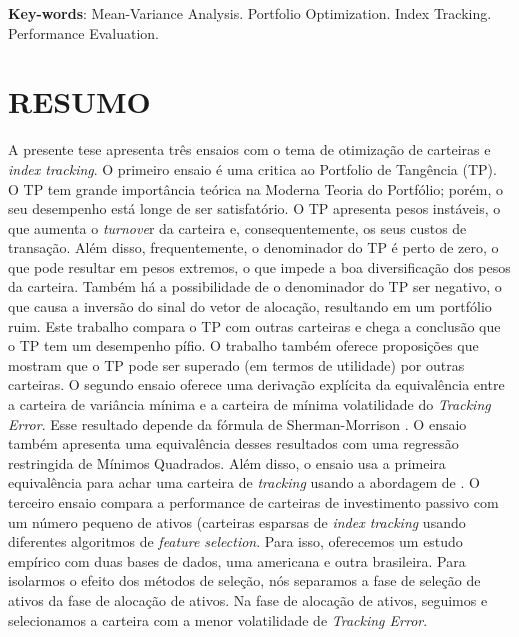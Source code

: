 \documentclass[12pt,oneside,a4paper]{memoir}
\begin{document}
\noindent
\textbf{Key-words}: Mean-Variance Analysis. Portfolio Optimization. Index Tracking. Performance Evaluation.

\chapter*{RESUMO}

\noindent
A presente tese apresenta três ensaios com o tema de otimização de carteiras e \textit{index tracking}.
O primeiro ensaio é uma critica ao Portfolio de Tangência (TP).
O TP tem grande importância teórica na Moderna Teoria do Portfólio; porém, o seu desempenho está longe de ser satisfatório.
O TP apresenta pesos instáveis, o que aumenta o \textit{turnove}r da carteira e, consequentemente, os seus custos de transação.
Além disso, frequentemente, o denominador do TP é perto de zero, o que pode resultar em pesos extremos, o que impede a boa diversificação dos pesos da carteira.
Também há a possibilidade de o denominador do TP ser negativo, o que causa a inversão do sinal do vetor de alocação, resultando em um portfólio ruim.
Este trabalho compara o TP com outras carteiras e chega a conclusão que o TP tem um desempenho pífio.
O trabalho também oferece proposições que mostram que o TP pode ser superado (em termos de utilidade) por outras carteiras.
O segundo ensaio oferece uma derivação explícita da equivalência entre a carteira de variância mínima e a carteira de mínima volatilidade do \textit{Tracking Error}.
Esse resultado depende da fórmula de Sherman-Morrison .
O ensaio também apresenta uma equivalência desses resultados com uma regressão restringida de Mínimos Quadrados.
Além disso, o ensaio usa a primeira equivalência para achar uma carteira de \textit{tracking} usando a abordagem de .
O terceiro ensaio compara a performance de carteiras de investimento passivo com um número pequeno de ativos (carteiras esparsas de \textit{index tracking} usando diferentes algoritmos de \textit{feature selection}.
Para isso, oferecemos um estudo empírico com duas bases de dados, uma americana e outra brasileira.
Para isolarmos o efeito dos métodos de seleção, nós separamos a fase de seleção de ativos da fase de alocação de ativos.
Na fase de alocação de ativos, seguimos  e selecionamos a carteira com a menor volatilidade de \textit{Tracking Error}.
\end{document}
